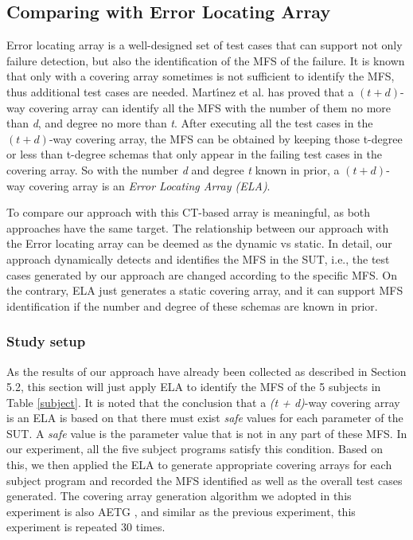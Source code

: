 \documentclass{sig-alternate}
\begin{document}
\subsection{Comparing with Error Locating Array}
Error locating array\cite{colbourn2008locating,martinez2009locating} is a well-designed set of test cases that can support not only failure detection, but also the identification of the MFS of the failure. It is known that only with a covering array sometimes is not sufficient to identify the MFS, thus additional test cases are needed. Mart{\'\i}nez et al.\cite{martinez2008algorithms} has proved that a $(t + d)$-way covering array can identify all the MFS with the number of them no more than \emph{d}, and degree no more than \emph{t}.
After executing all the test cases in the $(t + d)$-way covering array, the MFS can be obtained by keeping those t-degree or less than t-degree schemas that only appear in the failing test cases in the covering array.  So with the number \emph{d} and degree \emph{t} known in prior, a $(t + d)$-way covering array is an \emph{Error Locating Array (ELA)}.


To compare our approach with this CT-based array is meaningful, as both approaches have the same target. The relationship between our approach with the Error locating array can be deemed as the dynamic vs static. In detail, our approach dynamically detects and identifies the MFS in the SUT, i.e., the test cases generated by our approach are changed according to the specific MFS. On the contrary, ELA just generates a static covering array, and it can support MFS identification if the number and degree of these schemas are known in prior.



\subsubsection{Study setup}
As the results of our approach have already been collected as described in Section 5.2, this section will just apply ELA to identify the MFS of the 5 subjects in Table \ref{subject}. It is noted that the conclusion that a \emph{(t + d)}-way covering array is an ELA
 is based on that there must exist \emph{safe} values for each parameter of the SUT. A \emph{safe} value is the parameter value that is not in any part of these MFS. In our experiment, all the five subject programs satisfy this condition. Based on this, we then applied the ELA to generate appropriate covering arrays for each subject program and recorded the MFS identified as well as the overall test cases generated. The covering array generation algorithm we adopted in this experiment is also AETG \cite{cohen1997aetg}, and similar as the previous experiment, this experiment is repeated 30 times.
\end{document}
